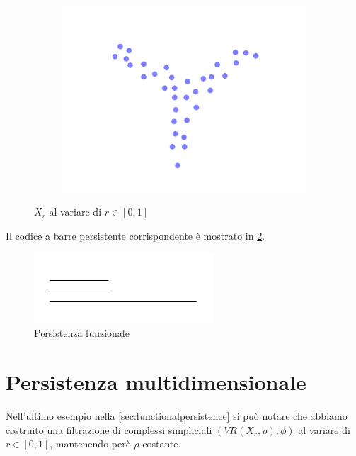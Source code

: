 \begin{figure}[ht]
\begin{center}
\begin{subfigure}[b]{.3\textwidth}
      \includegraphics[width=\textwidth]{gfx/functional_all.pdf}
    \end{subfigure}
    \caption{$X_r$ al variare di $r\in [0,1]$}  \label{fig:threeflarescomparison}
  \end{center}
\end{figure}

Il codice a barre persistente corrispondente è mostrato in \cref{fig:threeflarepersistence}.

\begin{figure}[ht]
  \includegraphics[width=.7\linewidth]{gfx/barcode_flares.pdf}
  \caption{Persistenza funzionale}
  \label{fig:threeflarepersistence}
\end{figure}

\section{Persistenza multidimensionale}

Nell'ultimo esempio nella \cref{sec:functionalpersistence} si può notare che abbiamo costruito una filtrazione di complessi simpliciali $(VR(X_r,\rho), \phi)$ al variare di $r\in [0,1]$, mantenendo però $\rho$ costante.


